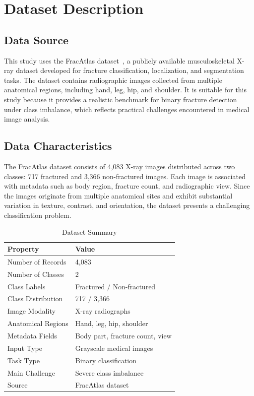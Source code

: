 \documentclass[conference]{IEEEtran}
\begin{document}
\section{Dataset Description}

\subsection{Data Source}

This study uses the FracAtlas dataset~\cite{abedeen2023}, a publicly available musculoskeletal X-ray dataset developed for fracture classification, localization, and segmentation tasks. The dataset contains radiographic images collected from multiple anatomical regions, including hand, leg, hip, and shoulder. It is suitable for this study because it provides a realistic benchmark for binary fracture detection under class imbalance, which reflects practical challenges encountered in medical image analysis.

\subsection{Data Characteristics}

The FracAtlas dataset consists of 4,083 X-ray images distributed across two classes: 717 fractured and 3,366 non-fractured images. Each image is associated with metadata such as body region, fracture count, and radiographic view. Since the images originate from multiple anatomical sites and exhibit substantial variation in texture, contrast, and orientation, the dataset presents a challenging classification problem.

\begin{table}[H]
\centering
\caption{Dataset Summary}
\label{tab:dataset_summary}
\renewcommand{\arraystretch}{1.2}
\begin{tabular}{>{\raggedright\arraybackslash}p{4.2cm} p{3.2cm}}
\toprule
\textbf{Property} & \textbf{Value} \\
\midrule
Number of Records & 4,083 \\
Number of Classes & 2 \\
Class Labels & Fractured / Non-fractured \\
Class Distribution & 717 / 3,366 \\
Image Modality & X-ray radiographs \\
Anatomical Regions & Hand, leg, hip, shoulder \\
Metadata Fields & Body part, fracture count, view \\
Input Type & Grayscale medical images \\
Task Type & Binary classification \\
Main Challenge & Severe class imbalance \\
Source & FracAtlas dataset~\cite{abedeen2023} \\
\bottomrule
\end{tabular}
\end{table}
\end{document}
